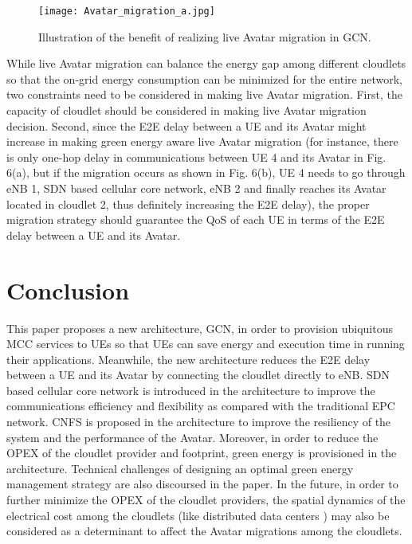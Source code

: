 \documentclass[journal,12pt,draftclsnofoot,onecolumn]{IEEEtran}
\begin{document}
\begin{figure*}[!h]
\begin{minipage}[t]{1\linewidth}
        \centering
        \texttt{[image: Avatar\_migration\_a.jpg]}
    	\caption{Illustration of the benefit of realizing live Avatar migration in GCN.}
    	\label{fig:Avatar_migration_a}
\end{minipage}
\end{figure*}

While live Avatar migration can balance the energy gap among different cloudlets so that the on-grid energy consumption can be minimized for the entire network, two constraints need to be considered in making live Avatar migration. First, the capacity of cloudlet should be considered in making live Avatar migration decision. Second, since the E2E delay between a UE and its Avatar might increase in making green energy aware live Avatar migration (for instance, there is only one-hop delay in communications between UE 4 and its Avatar in Fig. 6(a), but if the migration occurs as shown in Fig. 6(b), UE 4 needs to go through eNB 1, SDN based cellular core network, eNB 2 and finally reaches its Avatar located in cloudlet 2, thus definitely increasing the E2E delay), the proper migration strategy should guarantee the QoS of each UE in terms of the E2E delay between a UE and its Avatar.

\section{Conclusion}
This paper proposes a new architecture, GCN, in order to provision ubiquitous MCC services to UEs so that UEs can save energy and execution time in running their applications. Meanwhile, the new architecture reduces the E2E delay between a UE and its Avatar by connecting the cloudlet directly to eNB. SDN based cellular core network is introduced in the architecture to improve the communications efficiency and flexibility as compared with the traditional EPC network. CNFS is proposed in the architecture to improve the resiliency of the system and the performance of the Avatar. Moreover, in order to reduce the OPEX of the cloudlet provider and  footprint, green energy is provisioned in the architecture. Technical challenges of designing an optimal green energy management strategy are also discoursed in the paper. In the future, in order to further minimize the OPEX of the cloudlet providers, the spatial dynamics of the electrical cost among the cloudlets (like distributed data centers \cite{14}) may also be considered as a determinant to affect the Avatar migrations among the cloudlets.
\end{document}
